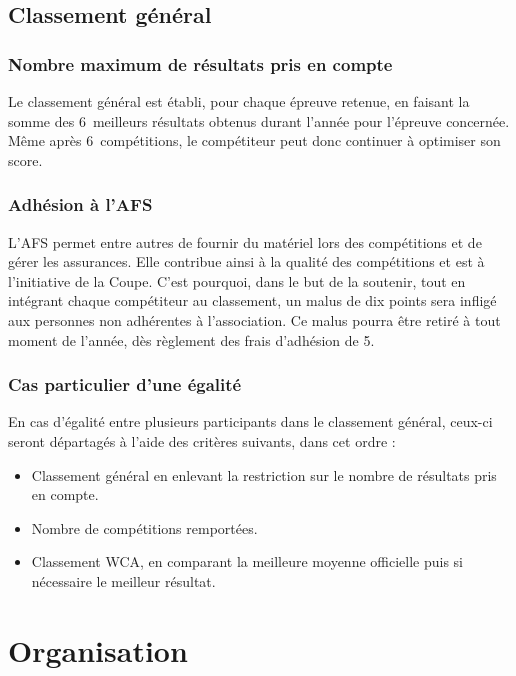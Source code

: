 \documentclass[10pt,a4paper]{article}
\newcommand{\3}{$3\times3$}
\newcommand{\4}{$4\times4$}
\newcommand{\2}{$2\times2$}
\newcommand{\maxcomp}{6} %
\begin{document}

\subsection{Classement général}

\subsubsection{Nombre maximum de résultats pris en compte}

Le classement général est établi, pour chaque épreuve retenue, en faisant la somme des \maxcomp\ meilleurs résultats obtenus durant l'année pour l'épreuve concernée. Même après \maxcomp\ compétitions, le compétiteur peut donc continuer à optimiser son score.

\subsubsection{Adhésion à l'AFS}

L'AFS permet entre autres de fournir du matériel lors des compétitions et de gérer les assurances. Elle contribue ainsi à la qualité des compétitions et est à l'initiative de la Coupe. C'est pourquoi, dans le but de la soutenir, tout en intégrant chaque compétiteur au classement, un malus de dix points sera infligé aux personnes non adhérentes à l'association. Ce malus pourra être retiré à tout moment de l'année, dès règlement des frais d'adhésion de 5\texteuro .

\subsubsection{Cas particulier d'une égalité}

En cas d'égalité entre plusieurs participants dans le classement général, ceux-ci seront départagés à l'aide des critères suivants, dans cet ordre :

\begin{itemize}
\item Classement général en enlevant la restriction sur le nombre de résultats pris en compte.
\item Nombre de compétitions remportées.
\item Classement WCA, en comparant la meilleure moyenne officielle puis si nécessaire le meilleur résultat.
\end{itemize}


\section{Organisation}
\end{document}
